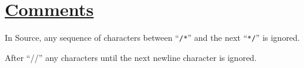 \section*{\href{https://source-academy.github.io/sicp/chapters/2.2.3.html\#footnote-8}{Comments}}

In Source, any sequence of characters between ``\texttt{/*}'' and
the next ``\texttt{*/}'' is ignored.

After ``//'' any characters until the next newline character is ignored.
